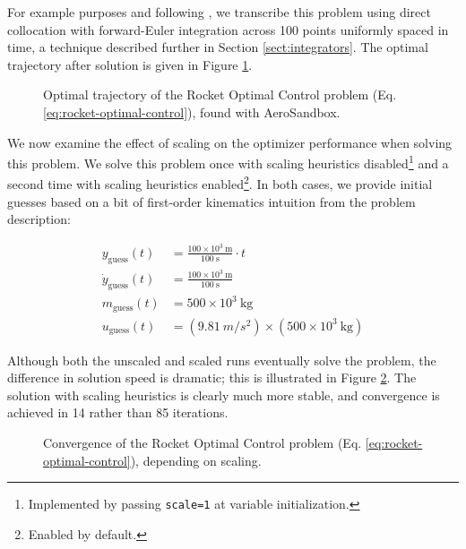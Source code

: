 For example purposes and following \cite{durbin}, we transcribe this problem using direct collocation with forward-Euler integration across 100 points uniformly spaced in time, a technique described further in Section \ref{sect:integrators}. The optimal trajectory after solution is given in Figure \ref{fig:rocket-trajectory}.

\begin{figure}[H]
    \centering
    \ifdraft{}{}
    \caption{Optimal trajectory of the Rocket Optimal Control problem (Eq. \ref{eq:rocket-optimal-control}), found with AeroSandbox.}
    \label{fig:rocket-trajectory}
\end{figure}

We now examine the effect of scaling on the optimizer performance when solving this problem. We solve this problem once with scaling heuristics disabled\footnote{Implemented by passing \texttt{scale=1} at variable initialization.} and a second time with scaling heuristics enabled\footnote{Enabled by default.}. In both cases, we provide initial guesses based on a bit of first-order kinematics intuition from the problem description:

\begin{equation*}
    \begin{aligned}
        y_\text{guess}(t) &= \frac{100 \times 10^3\ \si{\meter}}{100\ \si{\second}} \cdot t\\
        \dot{y}_\text{guess}(t) &= \frac{100 \times 10^3\ \si{\meter}}{100\ \si{\second}}\\
        m_\text{guess}(t) &= 500 \times 10^3\ \si{\kg}\\
        u_\text{guess}(t) &= (9.81\ \si{m/s^2}) \times (500 \times 10^3\ \si{\kg})
    \end{aligned}
\end{equation*}

Although both the unscaled and scaled runs eventually solve the problem, the difference in solution speed is dramatic; this is illustrated in Figure \ref{fig:rocket-convergence}. The solution with scaling heuristics is clearly much more stable, and convergence is achieved in 14 rather than 85 iterations.

\begin{figure}[H]
    \centering
    \centerline{\ifdraft{}{}}
    \caption{Convergence of the Rocket Optimal Control problem (Eq. \ref{eq:rocket-optimal-control}), depending on scaling.}
    \label{fig:rocket-convergence}
\end{figure}

